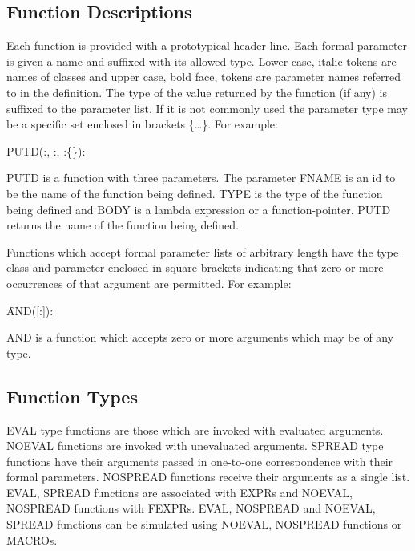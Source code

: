 \documentclass[11pt,letterpaper]{book}
\begin{document}
\subsection{Function Descriptions}

Each function is provided with a prototypical header line. Each formal
parameter is given a name and suffixed with its allowed type.  Lower
case, italic tokens are names of classes and upper case, bold face,
tokens are parameter names referred to in the definition. The type of
the value returned by the function (if any) is suffixed to the
parameter list.  If it is not commonly used the parameter type may be
a specific set enclosed in brackets \{\ldots\}.  For example:


\vspace{.1in}
\noindent \f{PUTD}(:, :,
:\{\}):
\vspace{.1in}

PUTD is a function with three parameters. The parameter FNAME is an id
to be the name of the function being defined. TYPE is the type of the
function being defined and BODY is a lambda expression or a
function-pointer. PUTD returns the name of the function being defined.



Functions which accept formal parameter lists of arbitrary length have
the type class and parameter enclosed in square brackets indicating
that zero or more occurrences of that argument are permitted.
 For example:

\vspace{.1in}
\noindent \f{AND}([:]):
\vspace{.1in}

AND is a function which accepts zero or more arguments which may be of
any type.

\subsection{Function Types}

EVAL type functions are those which are invoked with evaluated
arguments. NOEVAL functions are invoked with unevaluated arguments.
SPREAD type functions have their arguments passed in one-to-one
correspondence with their formal parameters. NOSPREAD functions
receive their arguments as a single list. EVAL, SPREAD functions are
associated with EXPRs and NO\-EVAL, NO\-SPREAD functions with FEXPRs.
EVAL, NO\-SPREAD and NOEVAL, SPREAD functions can be simulated using
NOEVAL, NO\-SPREAD functions or MACROs. 
\end{document}

